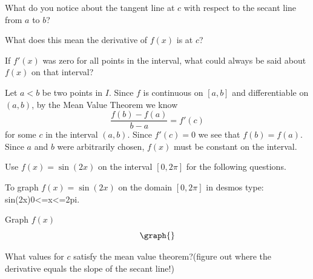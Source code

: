 \documentclass{ximera}
\begin{document}
\begin{question}
What do you notice about the tangent line at $c$ with respect to the secant line from $a$ to $b$?

\begin{multipleChoice}
\end{multipleChoice}

What does this mean the derivative of $f(x)$ is at $c$?

\begin{multipleChoice}
\end{multipleChoice}

If $f'(x)$ was zero for all points in the interval, what could always be said about $f(x)$ on that interval?
\begin{multipleChoice}
\end{multipleChoice}
\begin{explanation}
Let $a< b$ be two points in $I$. Since $f$ is continuous on $[a,b]$
and differentiable on $(a,b)$, by the Mean Value Theorem we know
\[
\frac{f(b)-f(a)}{b-a} = f'(c)
\]
for some $c$ in the interval $(a,b)$. Since $f'(c)=0$ we see that
$f(b)=f(a)$. Since $a$ and $b$ were arbitrarily chosen,
$f(x)$ must be constant on the interval.
\end{explanation}
\end{question}
\begin{question}
Use $f(x)=\sin(2x)$ on the interval $[0,2\pi]$ for the following questions.
\begin{hint}
To graph $f(x)=\sin(2x)$ on the domain $[0,2\pi]$ in desmos type: sin(2x){0<=x<=2pi}.
\end{hint}
Graph $f(x)$
\[
\graph{}
\]

What values for $c$ satisfy the mean value theorem?(figure out where the derivative equals the slope of the secant line!)

\begin{selectAll}
\choice{$\pi$}
\end{selectAll}

\end{question}
\end{document}
